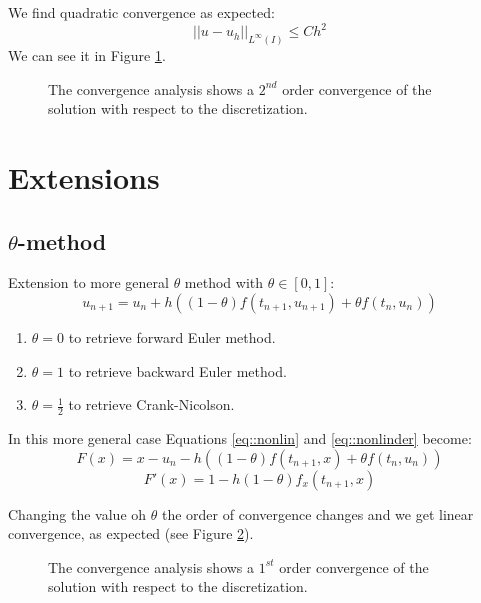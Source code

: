 \documentclass[]{article}
\begin{document}
We find quadratic convergence as expected:
$$| |  u - u_h ||_{L^\infty( I )} \leq Ch^2$$
We can see it in Figure \ref{fig::order2}.

\begin{figure}[t!]
	\centering
	\caption{The convergence analysis shows a $2^{nd}$ order convergence of the solution with respect to the discretization.}
	\label{fig::order2}
\end{figure}


\section{Extensions}

\subsection{$\theta$-method}

Extension to more general $\theta$ method with $\theta \in [0,1]$:
$$u_{n+1} = u_n + h \left( (1-\theta) f(t_{n+1},u_{n+1}) + \theta f(t_{n},u_{n})  \right) $$

\begin{enumerate}
\item $\theta = 0$ to retrieve forward Euler method.
\item $\theta = 1$ to retrieve backward Euler method.
\item $\theta = \frac{1}{2}$ to retrieve Crank-Nicolson.
\end{enumerate}
In this more general case Equations \ref{eq::nonlin} and \ref{eq::nonlinder} become:
$$F(x) = x - u_n - h \left( (1-\theta) f(t_{n+1}, x) + \theta f(t_{n},u_{n})  \right) $$ 
$$F'(x) = 1 - h (1-\theta) f_x(t_{n+1}, x)  $$ 

Changing the value oh $\theta$ the order of convergence changes and we get linear convergence, as expected (see Figure \ref{fig::order1}).

\begin{figure}[h!]
	\centering
	\caption{The convergence analysis shows a $1^{st}$ order convergence of the solution with respect to the discretization.}
	\label{fig::order1}
\end{figure}

\newpage
\end{document}
